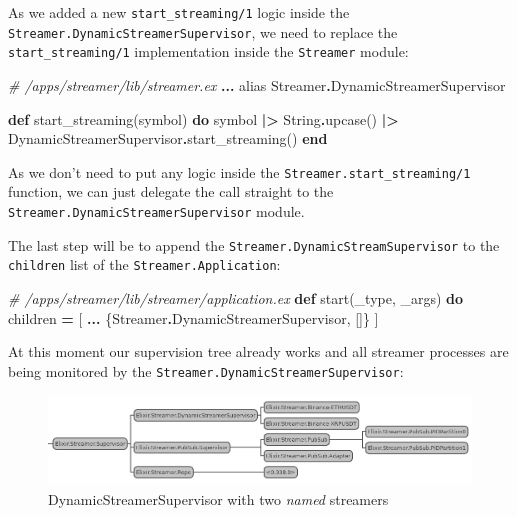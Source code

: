 \documentclass[
  oneside]{book}
\newenvironment{Shaded}{\begin{snugshade}}{\end{snugshade}}
\newcommand{\CommentTok}[1]{\textcolor[rgb]{0.56,0.35,0.01}{\textit{#1}}}
\newcommand{\ConstantTok}[1]{\textcolor[rgb]{0.00,0.00,0.00}{#1}}
\newcommand{\ImportTok}[1]{#1}
\newcommand{\KeywordTok}[1]{\textcolor[rgb]{0.13,0.29,0.53}{\textbf{#1}}}
\newcommand{\NormalTok}[1]{#1}
\newcommand{\OperatorTok}[1]{\textcolor[rgb]{0.81,0.36,0.00}{\textbf{#1}}}
\begin{document}
As we added a new \texttt{start\_streaming/1} logic inside the \texttt{Streamer.DynamicStreamerSupervisor}, we need to replace the \texttt{start\_streaming/1} implementation inside the \texttt{Streamer} module:

\begin{Shaded}
\begin{Highlighting}[]
\CommentTok{\# /apps/streamer/lib/streamer.ex}
  \OperatorTok{...}
  \ImportTok{alias} \ConstantTok{Streamer}\OperatorTok{.}\ConstantTok{DynamicStreamerSupervisor}

  \KeywordTok{def}\NormalTok{ start\_streaming(symbol) }\KeywordTok{do}
\NormalTok{    symbol}
    \OperatorTok{|\textgreater{}} \ConstantTok{String}\OperatorTok{.}\NormalTok{upcase()}
    \OperatorTok{|\textgreater{}} \ConstantTok{DynamicStreamerSupervisor}\OperatorTok{.}\NormalTok{start\_streaming()}
  \KeywordTok{end}
\end{Highlighting}
\end{Shaded}

As we don't need to put any logic inside the \texttt{Streamer.start\_streaming/1} function, we can just delegate the call straight to the \texttt{Streamer.DynamicStreamerSupervisor} module.

The last step will be to append the \texttt{Streamer.DynamicStreamSupervisor} to the \texttt{children} list of the \texttt{Streamer.Application}:

\begin{Shaded}
\begin{Highlighting}[]
  \CommentTok{\# /apps/streamer/lib/streamer/application.ex}
  \KeywordTok{def}\NormalTok{ start(\_type, \_args) }\KeywordTok{do}
\NormalTok{    children }\OperatorTok{=}\NormalTok{ [}
      \OperatorTok{...}
\NormalTok{      \{}\ConstantTok{Streamer}\OperatorTok{.}\ConstantTok{DynamicStreamerSupervisor}\NormalTok{, []\}}
\NormalTok{    ]}
\end{Highlighting}
\end{Shaded}

At this moment our supervision tree already works and all streamer processes are being monitored by the \texttt{Streamer.DynamicStreamerSupervisor}:

\begin{figure}
\centering
\includegraphics{images/chapter_11_03_first_sup_tree.png}
\caption{DynamicStreamerSupervisor with two \emph{named} streamers}
\end{figure}
\end{document}
